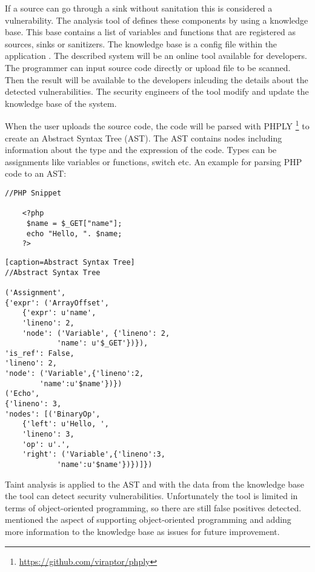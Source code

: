 If a source can go through a sink without sanitation this is considered a vulnerability. The analysis tool of \textcite[]{Maskur2019} defines these components by using a knowledge base. This base contains a list of variables and functions that are registered as sources, sinks or sanitizers. The knowledge base is a config file within the application \autocite[3]{Maskur2019}. The described system will be an online tool available for developers. The programmer can input source code directly or upload file to be scanned. Then the result will be available to the developers inlcuding the details about the detected vulnerabilities. The security engineers of the tool modify and update the knowledge base of the system.\newline

When the user uploads the source code, the code will be parsed with PHPLY \footnote{ \url{https://github.com/viraptor/phply}} to create an Abstract Syntax Tree (AST). The AST contains nodes including information about the type and the expression of the code. Types can be assignments like variables or functions, switch etc. An example for parsing PHP code to an AST:

\begin{verbatim}
//PHP Snippet

    <?php
     $name = $_GET["name"];
     echo "Hello, ". $name;
    ?>  
\end{verbatim}

\begin{verbatim}[caption=Abstract Syntax Tree]
//Abstract Syntax Tree

('Assignment', 
{'expr': ('ArrayOffset',
    {'expr': u'name', 
    'lineno': 2, 
    'node': ('Variable', {'lineno': 2,
            'name': u'$_GET'})}),
'is_ref': False, 
'lineno': 2, 
'node': ('Variable',{'lineno':2,
        'name':u'$name'})}) 
('Echo',
{'lineno': 3, 
'nodes': [('BinaryOp',
    {'left': u'Hello, ', 
    'lineno': 3,
    'op': u'.', 
    'right': ('Variable',{'lineno':3,
            'name':u'$name'})})]})
\end{verbatim}


Taint analysis is applied to the AST and with the data from the knowledge base the tool can detect security vulnerabilities. Unfortunately the tool is limited in terms of object-oriented programming, so there are still false positives detected. \textcite[]{Maskur2019} mentioned the aspect of supporting object-oriented programming and adding more information to the knowledge base as issues for future improvement.


